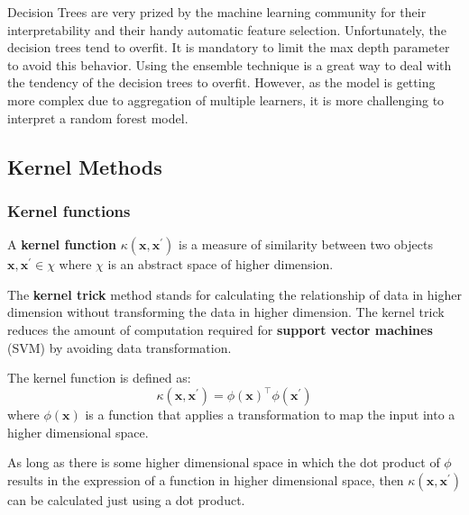 \documentclass[12pt]{report}
\begin{document}
            Decision Trees are very prized by the machine learning community for their interpretability and their handy automatic feature selection. Unfortunately, the decision trees tend to overfit. It is mandatory to limit the max depth parameter to avoid this behavior. Using the ensemble technique is a great way to deal with the tendency of the decision trees to overfit. However, as the model is getting more complex due to aggregation of multiple learners, it is more challenging to interpret a random forest model.
            
    \subsection{Kernel Methods}
        \subsubsection{Kernel functions}
            A \textbf{kernel function} $\kappa(\boldsymbol{x}, \boldsymbol{x^{'}})$ is a measure of similarity between two objects $\boldsymbol{x}, \boldsymbol{x^{'}} \in \chi$ where $\chi$ is an abstract space of higher dimension. 
            
            The \textbf{kernel trick} method stands for calculating the relationship of data in higher dimension without transforming the data in higher dimension. The kernel trick reduces the amount of computation required for \textbf{support vector machines} (SVM) by avoiding data transformation.
            
            The kernel function is defined as:
            \begin{equation}
                \kappa(\boldsymbol{x}, \boldsymbol{x}^{'}) = \phi(\boldsymbol{x})^\top \phi(\boldsymbol{x}^{'})
            \end{equation}
            where $\phi(\boldsymbol{x})$ is a function that applies a transformation to map the input into a higher dimensional space.
            
            As long as there is some higher dimensional space in which the dot product of $\phi$ results in the expression of a function in higher dimensional space, then $\kappa(\boldsymbol{x}, \boldsymbol{x}^{'})$ can be calculated just using a dot product.
            
\end{document}
